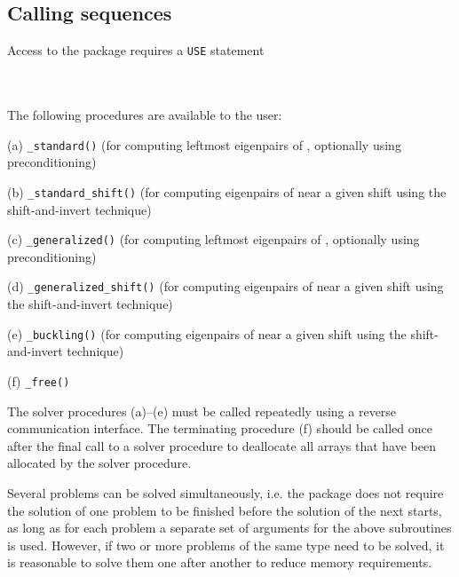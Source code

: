 \subsection{Calling sequences}

\label{sec:call}

Access to the package requires a {\tt USE} statement \\ \\
\indent\hspace{8mm}{\tt use \fullpackagename} \\

\medskip

\noindent The following procedures are available to the user:
%
\begin{description}
\vspace{-0.1cm}
\item (a) {\tt \solver\_standard()} 
(for computing leftmost eigenpairs of , 
optionally using preconditioning)
\item (b) {\tt \solver\_standard\_shift()} 
(for computing eigenpairs of  near a given shift %
using the shift-and-invert technique)
\item (c) {\tt \solver\_generalized()} 
(for computing leftmost eigenpairs of 
, optionally using preconditioning)
\item (d) {\tt \solver\_generalized\_shift()} 
(for computing eigenpairs of 
 near a given shift %
using the shift-and-invert technique)
\item (e) {\tt \solver\_buckling()} 
(for computing eigenpairs of 
 near a given shift %
using the shift-and-invert technique)
\item (f) {\tt \solver\_free()} 
%
\end{description}

The solver procedures (a)--(e)
must be called repeatedly using
a reverse communication interface.
The terminating procedure (f)
should be called once after the
final call to 
a solver procedure
to deallocate all arrays 
that have been allocated by %
the solver procedure.

Several problems can be solved simultaneously,
i.e. the package does not require the solution of
one problem to be finished before the solution of
the next starts, as long as for each problem a separate set
of arguments for the above subroutines is used.
However, if two or more problems of the same type
need to be solved, it is reasonable to solve them one
after another  to reduce  memory requirements.
\fi

